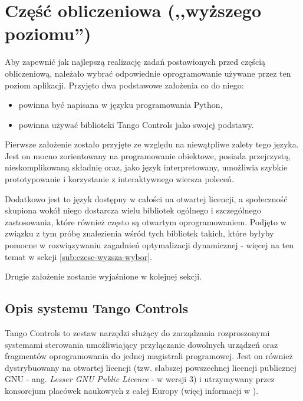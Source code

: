 \section{Część obliczeniowa (,,wyższego poziomu'')}
\label{sec:czesc-wyzsza}

Aby zapewnić jak najlepszą realizację zadań postawionych przed częścią obliczeniową, należało wybrać odpowiednie oprogramowanie używane przez ten poziom aplikacji. Przyjęto dwa podstawowe założenia co do niego:
\begin{itemize}
    \item powinna być napisana w języku programowania Python,
    \item powinna używać biblioteki Tango Controls jako swojej podstawy.
\end{itemize}

Pierwsze założenie zostało przyjęte ze względu na niewątpliwe zalety tego języka. Jest on mocno zorientowany na programowanie obiektowe, posiada przejrzystą, nieskomplikowaną składnię oraz, jako język interpretowany, umożliwia szybkie prototypowanie i korzystanie z interaktywnego wiersza poleceń.

Dodatkowo jest to język dostępny w całości na otwartej licencji, a społeczność skupiona wokół niego dostarcza wielu bibliotek ogólnego i szczególnego zastosowania, które również często są otwartym oprogramowaniem. Podjęto w związku z tym próbę znalezienia wśród tych bibliotek takich, które byłyby pomocne w rozwiązywaniu zagadnień optymalizacji dynamicznej - więcej na ten temat w sekcji \ref{sub:czesc-wyzsza-wybor}.

Drugie założenie zostanie wyjaśnione w kolejnej sekcji.

\subsection{Opis systemu Tango Controls}
\label{sub:czesc-wyzsza-tango}

Tango Controls to zestaw narzędzi służący do zarządzania rozproszonymi systemami sterowania umożliwiający przyłączanie dowolnych urządzeń oraz fragmentów oprogramowania do jednej magistrali programowej. Jest on również dystrybuowany na otwartej licencji (tzw. słabszej powszechnej licencji publicznej GNU - ang. \emph{Lesser GNU Public Licence} - w wersji 3) i utrzymywany przez konsorcjum placówek naukowych z całej Europy (więcj informacji w \cite{TangoWebsite}).


